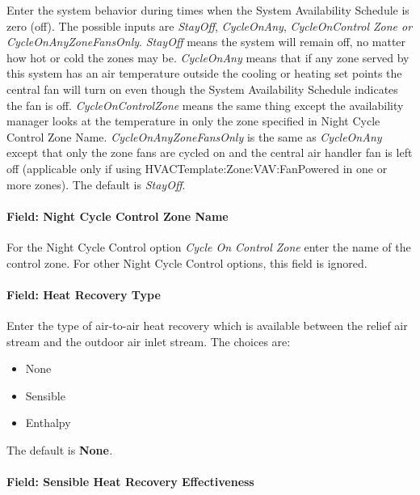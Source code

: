 Enter the system behavior during times when the System Availability Schedule is zero (off). The possible inputs are \emph{StayOff}, \emph{CycleOnAny}, \emph{CycleOnControl Zone or CycleOnAnyZoneFansOnly}. \emph{StayOff} means the system will remain off, no matter how hot or cold the zones may be. \emph{CycleOnAny} means that if any zone served by this system has an air temperature outside the cooling or heating set points the central fan will turn on even though the System Availability Schedule indicates the fan is off. \emph{CycleOnControlZone} means the same thing except the availability manager looks at the temperature in only the zone specified in Night Cycle Control Zone Name. \emph{CycleOnAnyZoneFansOnly} is the same as \emph{CycleOnAny} except that only the zone fans are cycled on and the central air handler fan is left off (applicable only if using HVACTemplate:Zone:VAV:FanPowered in one or more zones). The default is \emph{StayOff}.

\paragraph{Field: Night Cycle Control Zone Name}\label{field-night-cycle-control-zone-name-2}

For the Night Cycle Control option \emph{Cycle On Control Zone} enter the name of the control zone. For other Night Cycle Control options, this field is ignored.

\paragraph{Field: Heat Recovery Type}\label{field-heat-recovery-type-4}

Enter the type of air-to-air heat recovery which is available between the relief air stream and the outdoor air inlet stream. The choices are:

\begin{itemize}
\item
  None
\item
  Sensible
\item
  Enthalpy
\end{itemize}

The default is \textbf{None}\emph{.}

\paragraph{Field: Sensible Heat Recovery Effectiveness}\label{field-sensible-heat-recovery-effectiveness-4}

